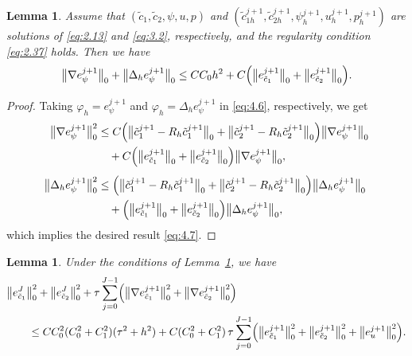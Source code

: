 \documentclass[a4paper,fleqn]{cas-sc}
\numberwithin{equation}{section}
\newtheorem{lemma}[theorem]{Lemma}
\theoremstyle{definition}
\begin{document}
\begin{lemma}\label{lem:epsi-l2}
Assume that $(\tilde{c}_{1},\tilde{c}_{2},\psi,u,p)$ and
$(\tilde{c}_{1h}^{j+1},\tilde{c}_{2h}^{j+1},\psi_{h}^{j+1},u_{h}^{j+1},p_{h}^{j+1})$
are solutions of \eqref{eq:2.13} and \eqref{eq:3.2}, respectively, and the regularity
condition \eqref{eq:2.37} holds. Then we have
\begin{equation}\label{eq:4.7}
  \bigl\|\nabla e_{\psi}^{j+1}\bigr\|_{0}
  + \bigl\|\Delta_{h} e_{\psi}^{j+1}\bigr\|_{0}
  \leq CC_{0}h^{2}
  + C\Bigl(\bigl\|e_{\tilde{c}_{1}}^{j+1}\bigr\|_{0}
           + \bigl\|e_{\tilde{c}_{2}}^{j+1}\bigr\|_{0}\Bigr).
\end{equation}
\end{lemma}

\begin{proof}
Taking $\varphi_{h} = e_{\psi}^{j+1}$ and $\varphi_{h} = \Delta_{h}e_{\psi}^{j+1}$
in \eqref{eq:4.6}, respectively, we get
\begin{align}
  \bigl\|\nabla e_{\psi}^{j+1}\bigr\|_{0}^{2}
  &\leq C\Bigl(\bigl\|\tilde{c}_{1}^{j+1} - R_{h}\tilde{c}_{1}^{j+1}\bigr\|_{0}
              + \bigl\|\tilde{c}_{2}^{j+1} - R_{h}\tilde{c}_{2}^{j+1}\bigr\|_{0}\Bigr)
         \bigl\|\nabla e_{\psi}^{j+1}\bigr\|_{0} \nonumber\\
  &\quad + C\Bigl(\bigl\|e_{\tilde{c}_{1}}^{j+1}\bigr\|_{0}
                 + \bigl\|e_{\tilde{c}_{2}}^{j+1}\bigr\|_{0}\Bigr)
            \bigl\|\nabla e_{\psi}^{j+1}\bigr\|_{0},
  \label{eq:4.8}\\[4pt]
  \bigl\|\Delta_{h}e_{\psi}^{j+1}\bigr\|_{0}^{2}
  &\leq \Bigl(\bigl\|\tilde{c}_{1}^{j+1} - R_{h}\tilde{c}_{1}^{j+1}\bigr\|_{0}
             + \bigl\|\tilde{c}_{2}^{j+1} - R_{h}\tilde{c}_{2}^{j+1}\bigr\|_{0}\Bigr)
        \bigl\|\Delta_{h}e_{\psi}^{j+1}\bigr\|_{0} \nonumber\\
  &\quad + \Bigl(\bigl\|e_{\tilde{c}_{1}}^{j+1}\bigr\|_{0}
                + \bigl\|e_{\tilde{c}_{2}}^{j+1}\bigr\|_{0}\Bigr)
           \bigl\|\Delta_{h}e_{\psi}^{j+1}\bigr\|_{0},
  \label{eq:4.9}
\end{align}
which implies the desired result \eqref{eq:4.7}.
\end{proof}

\begin{lemma}\label{lem:ec-l2}
Under the conditions of Lemma~\ref{lem:epsi-l2}, we have
\begin{align}
  &\bigl\|e_{\tilde{c}_{1}}^{J}\bigr\|_{0}^{2}
   + \bigl\|e_{\tilde{c}_{2}}^{J}\bigr\|_{0}^{2}
   + \tau\sum_{j=0}^{J-1}\Bigl(\bigl\|\nabla e_{\tilde{c}_{1}}^{j+1}\bigr\|_{0}^{2}
                               + \bigl\|\nabla e_{\tilde{c}_{2}}^{j+1}\bigr\|_{0}^{2}\Bigr)
  \nonumber\\
  &\qquad \leq CC_{0}^{2}(C_{0}^{2}+C_{1}^{2})(\tau^{2}+h^{2})
   + C(C_{0}^{2}+C_{1}^{2})\,\tau\sum_{j=0}^{J-1}
     \Bigl(\bigl\|e_{\tilde{c}_{1}}^{j+1}\bigr\|_{0}^{2}
          + \bigl\|e_{\tilde{c}_{2}}^{j+1}\bigr\|_{0}^{2}
          + \bigl\|e_{u}^{j+1}\bigr\|_{0}^{2}\Bigr).
  \label{eq:4.10}
\end{align}
\end{lemma}
\end{document}
